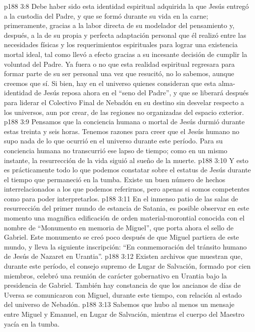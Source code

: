 \vs p188 3:8 Debe haber sido esta identidad espiritual adquirida la que Jesús entregó a la custodia del Padre, y que se formó durante su vida en la carne; primeramente, gracias a la labor directa de su modelador del pensamiento y, después, a la de su propia y perfecta adaptación personal que él realizó entre las necesidades físicas y los requerimientos espirituales para lograr una existencia mortal ideal, tal como llevó a efecto gracias a su incesante decisión de cumplir la voluntad del Padre. Ya fuera o no que esta realidad espiritual regresara para formar parte de su ser personal una vez que resucitó, no lo sabemos, aunque creemos que sí. Si bien, hay en el universo quienes consideran que esta alma\hyp{}identidad de Jesús reposa ahora en el “seno del Padre”, y que se liberará después para liderar el Colectivo Final de Nebadón en su destino sin desvelar respecto a los universos, aun por crear, de las regiones no organizadas del espacio exterior.
\vs p188 3:9 Pensamos que la conciencia humana o mortal de Jesús durmió durante estas treinta y seis horas. Tenemos razones para creer que el Jesús humano no supo nada de lo que ocurrió en el universo durante este período. Para su conciencia humana no transcurrió ese lapso de tiempo; como en un mismo instante, la resurrección de la vida siguió al sueño de la muerte.
\vs p188 3:10 \pc Y esto es prácticamente todo lo que podemos constatar sobre el estatus de Jesús durante el tiempo que permaneció en la tumba. Existe un buen número de hechos interrelacionados a los que podemos referirnos, pero apenas si somos competentes como para poder interpretarlos.
\vs p188 3:11 En el inmenso patio de las salas de resurrección del primer mundo de estancia de Satania, es posible observar en este momento una magnífica edificación de orden material\hyp{}morontial conocida con el nombre de “Monumento en memoria de Miguel”, que porta ahora el sello de Gabriel. Este monumento se creó poco después de que Miguel partiera de este mundo, y lleva la siguiente inscripción: “En conmemoración del tránsito humano de Jesús de Nazaret en Urantia”.
\vs p188 3:12 Existen archivos que muestran que, durante este período, el consejo supremo de Lugar de Salvación, formado por cien miembros, celebró una reunión de carácter gobernativo en Urantia bajo la presidencia de Gabriel. También hay constancia de que los ancianos de días de Uversa se comunicaron con Miguel, durante este tiempo, con relación al estado del universo de Nebadón.
\vs p188 3:13 Sabemos que hubo al menos un mensaje entre Miguel y Emanuel, en Lugar de Salvación, mientras el cuerpo del Maestro yacía en la tumba.
